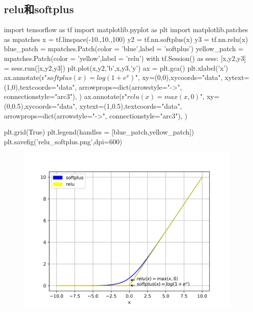 \subsection{relu和softplus}
\begin{python}
import tensorflow as tf 
import matplotlib.pyplot as plt 
import matplotlib.patches as mpatches
x = tf.linspace(-10.,10.,100)
y2 = tf.nn.softplus(x)
y3 = tf.nn.relu(x)
blue_patch = mpatches.Patch(color = 'blue',label = 'softplus')
yellow_patch = mpatches.Patch(color = 'yellow',label = 'relu')
with tf.Session() as sess:
	[x,y2,y3] = sess.run([x,y2,y3])
plt.plot(x,y2,'b',x,y3,'y')
ax = plt.gca()
plt.xlabel('x')
ax.annotate(r"$softplus(x)=log(1+e^x)$",
	   xy=(0,0),xycoords="data",
	   xytext=(1,0),textcoords="data",
	   arrowprops=dict(arrowstyle="->",
	   connectionstyle="arc3"),
)
ax.annotate(r"$relu(x)=max(x,0)$",
	   xy=(0,0.5),xycoords="data",
	   xytext=(1,0.5),textcoords="data",
	   arrowprops=dict(arrowstyle="->",
	   connectionstyle="arc3"),
)

plt.grid(True)
plt.legend(handles = [blue_patch,yellow_patch])
plt.savefig('relu_softplus.png',dpi=600)
\end{python}
\begin{figure}[H]
\centering
\includegraphics[scale=0.8]{./pic/chapter1/relu_softplus.png}
\end{figure}
